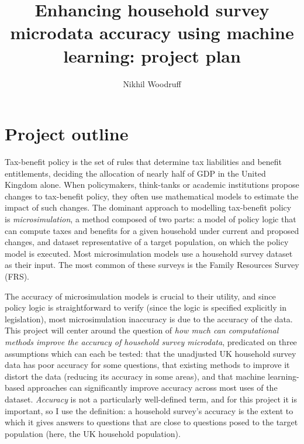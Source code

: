\documentclass[twocolumn]{article}
\title{Enhancing household survey microdata accuracy using machine learning: project plan}
\date{}
\author{Nikhil Woodruff}
\begin{document}
\maketitle

\section{Project outline}

Tax-benefit policy is the set of rules that determine tax liabilities and benefit entitlements, deciding the allocation of nearly half of GDP in the United Kingdom alone. When policymakers, think-tanks or academic institutions propose changes to tax-benefit policy, they often use mathematical models to estimate the impact of such changes. The dominant approach to modelling tax-benefit policy is \emph{microsimulation}, a method composed of two parts: a model of policy logic that can compute taxes and benefits for a given household under current and proposed changes, and dataset representative of a target population, on which the policy model is executed. Most microsimulation models use a household survey dataset as their input. The most common of these surveys is the Family Resources Survey (FRS).

The accuracy of microsimulation models is crucial to their utility, and since policy logic is straightforward to verify (since the logic is specified explicitly in legislation), most microsimulation inaccuracy is due to the accuracy of the data. This project will center around the question of \emph{how much can computational methods improve the accuracy of household survey microdata}, predicated on three assumptions which can each be tested: that the unadjusted UK household survey data has poor accuracy for some questions, that existing methods to improve it distort the data (reducing its accuracy in some areas), and that machine learning-based approaches can significantly improve accuracy across most uses of the dataset. \emph{Accuracy} is not a particularly well-defined term, and for this project it is important, so I use the definition: a household survey's accuracy is the extent to which it gives answers to questions that are close to questions posed to the target population (here, the UK household population).
\end{document}
